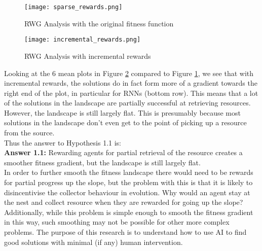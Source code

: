 \documentclass[12pt]{article}
\begin{document}
\begin{figure}[h]
\centering
\texttt{[image: sparse\_rewards.png]}
\caption{RWG Analysis with the original fitness function}
\label{fig:sparse}
\end{figure}

\begin{figure}[h]
\centering
\texttt{[image: incremental\_rewards.png]}
\caption{RWG Analysis with incremental rewards}
\label{fig:incremental}
\end{figure}

Looking at the 6 mean plots in Figure \ref{fig:incremental} compared to Figure \ref{fig:sparse}, we see that with incremental rewards, the solutions do in fact form more of a gradient towards the right end of the plot, in particular for RNNs (bottom row). 
This means that a lot of the solutions in the landscape are partially successful at retrieving resources. 
However, the landscape is still largely flat. 
This is presumably because most solutions in the landscape don't even get to the point of picking up a resource from the source.\\ 

Thus the answer to Hypothesis 1.1 is:\\

\textbf{Answer 1.1:} Rewarding agents for partial retrieval of the resource creates a smoother fitness gradient, but the landscape is still largely flat.\\

In order to further smooth the fitness landscape there would need to be rewards for partial progress up the slope, but the problem with this is that it is likely to disincentivise the collector behaviour in evolution.
Why would an agent stay at the nest and collect resource when they are rewarded for going up the slope? 
Additionally, while this problem is simple enough to smooth the fitness gradient in this way, such smoothing may not be possible for other more complex problems.
The purpose of this research is to understand how to use AI to find good solutions with minimal (if any) human intervention.\\
\end{document}
